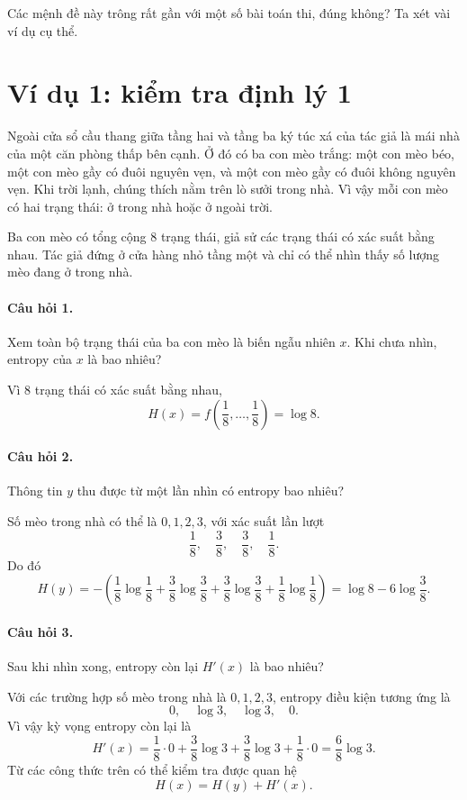 \documentclass[11pt]{article}
\begin{document}
Các mệnh đề này trông rất gần với một số bài toán thi, đúng không? Ta xét vài
ví dụ cụ thể.

\section{Ví dụ 1: kiểm tra định lý 1}

Ngoài cửa sổ cầu thang giữa tầng hai và tầng ba ký túc xá của tác giả là mái
nhà của một căn phòng thấp bên cạnh. Ở đó có ba con mèo trắng: một con mèo
béo, một con mèo gầy có đuôi nguyên vẹn, và một con mèo gầy có đuôi không
nguyên vẹn. Khi trời lạnh, chúng thích nằm trên lò sưởi trong nhà. Vì vậy mỗi
con mèo có hai trạng thái: ở trong nhà hoặc ở ngoài trời.

Ba con mèo có tổng cộng \(8\) trạng thái, giả sử các trạng thái có xác suất
bằng nhau. Tác giả đứng ở cửa hàng nhỏ tầng một và chỉ có thể nhìn thấy số
lượng mèo đang ở trong nhà.

\paragraph{Câu hỏi 1.}
Xem toàn bộ trạng thái của ba con mèo là biến ngẫu nhiên \(x\). Khi chưa nhìn,
entropy của \(x\) là bao nhiêu?

Vì \(8\) trạng thái có xác suất bằng nhau,
\[
  H(x)=f\left(\frac18,\ldots,\frac18\right)=\log 8.
\]

\paragraph{Câu hỏi 2.}
Thông tin \(y\) thu được từ một lần nhìn có entropy bao nhiêu?

Số mèo trong nhà có thể là \(0,1,2,3\), với xác suất lần lượt
\[
  \frac18,\quad \frac38,\quad \frac38,\quad \frac18.
\]
Do đó
\[
  H(y)=
  -\left(
  \frac18\log\frac18+
  \frac38\log\frac38+
  \frac38\log\frac38+
  \frac18\log\frac18
  \right)
  =\log 8-6\log\frac38.
\]

\paragraph{Câu hỏi 3.}
Sau khi nhìn xong, entropy còn lại \(H'(x)\) là bao nhiêu?

Với các trường hợp số mèo trong nhà là \(0,1,2,3\), entropy điều kiện tương
ứng là
\[
  0,\quad \log 3,\quad \log 3,\quad 0.
\]
Vì vậy kỳ vọng entropy còn lại là
\[
  H'(x)=\frac18\cdot 0+\frac38\log 3+\frac38\log 3+\frac18\cdot 0
  =\frac68\log 3.
\]
Từ các công thức trên có thể kiểm tra được quan hệ
\[
  H(x)=H(y)+H'(x).
\]
\end{document}
